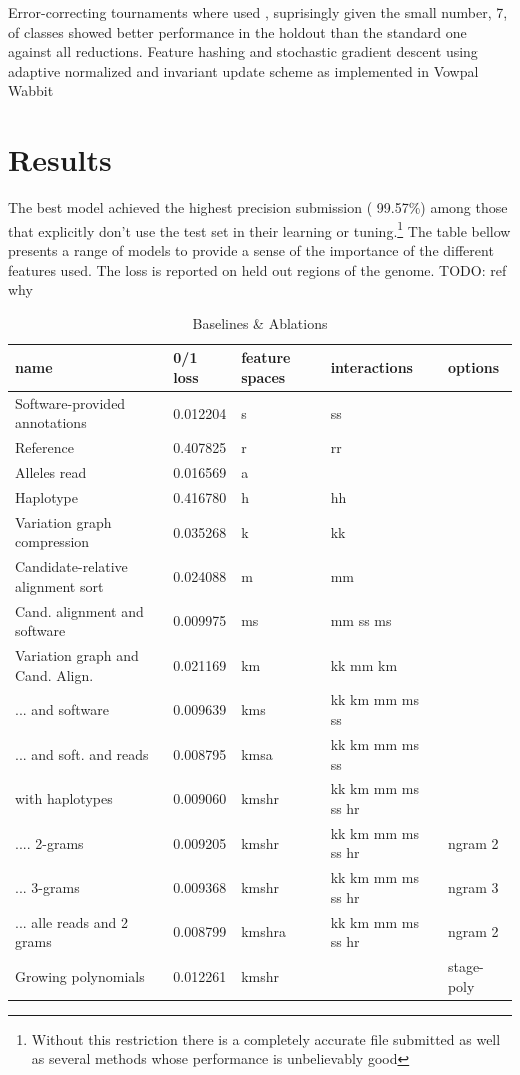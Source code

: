 \documentclass{article}
\begin{document}
Error-correcting tournaments \citep{beygelzimer2009error} where used , suprisingly given the small number, 7, of classes showed better performance in the holdout than the standard one against all reductions. 
Feature hashing and stochastic gradient descent using adaptive normalized and invariant update scheme as implemented in Vowpal Wabbit \cite{mcmahan2010adaptive, duchi2011adaptive, agarwal2014reliable} 



\section{Results}

The best model achieved the highest precision submission ( 99.57\%) among those that explicitly don't use the test set in their learning or tuning.\footnote{ Without this restriction there is a completely accurate file submitted as well as several methods whose performance is unbelievably good}
The table bellow presents a range of models to provide a sense of the importance of the different features used.
The loss is reported on held out regions of the genome. TODO: ref why


\begin{table}[]
  \centering
  \caption{Baselines \& Ablations }
  \label{ablation-results}
  \begin{tabular}{|l|l|l|l|l|}
    \hline
    name & 0/1 loss & feature spaces & interactions & options \\ \hline
    Software-provided annotations & 0.012204 & s & ss & \\
    Reference  & 0.407825 & r & rr &\\
    Alleles read & 0.016569 & a & & \\
    Haplotype & 0.416780 & h & hh & \\
    Variation graph compression & 0.035268 & k & kk & \\
    Candidate-relative alignment sort & 0.024088 & m & mm & \\
    Cand. alignment and software & 0.009975 & ms & mm  ss  ms & \\
    Variation graph and Cand. Align. & 0.021169 & km & kk  mm  km & \\
    ... and software & 0.009639 & kms & kk  km  mm  ms  ss & \\
    ... and soft. and reads & 0.008795 & kmsa & kk  km  mm  ms  ss & \\
    with haplotypes & 0.009060 & kmshr & kk  km  mm  ms  ss  hr & \\
    .... 2-grams  & 0.009205 & kmshr & kk  km  mm  ms  ss  hr & ngram 2 \\
    ... 3-grams & 0.009368 & kmshr & kk  km  mm  ms  ss  hr & ngram 3 \\
    ... alle reads and 2 grams  & 0.008799 & kmshra & kk  km  mm  ms  ss  hr & ngram 2 \\
    Growing polynomials & 0.012261 & kmshr & & stage-poly \\
    \hline
  \end{tabular}
\end{table}
\end{document}
